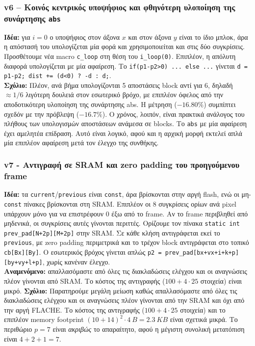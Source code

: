 \documentclass[11pt,a4paper]{article}
\newcommand{\code}[1]{\texttt{#1}}
\newcommand{\en}[1]{\foreignlanguage{english}{#1}}
\begin{document}
\subsubsection{v6 -- Κοινός κεντρικός υποψήφιος και φθηνότερη υλοποίηση της συνάρτησης \code{abs}}
\textbf{Ιδέα:} για $i=0$ ο υποψήφιος στον άξονα $x$ και στον άξονα $y$ είναι το ίδιο μπλοκ, άρα η απόστασή του υπολογίζεται μία φορά και χρησιμοποιείται και στις δύο
συγκρίσεις. Προσθέτουμε νέα \en{macro} \code{c\_loop} στη θέση του \code{i\_loop(0)}. Επιπλέον, η απόλυτη διαφορά υπολογίζεται με μία αφαίρεση.
Το \code{if(p1-p2>0) ... else ...} γίνεται \code{d = p1-p2; dist += (d<0) ? -d : d;}.\\
\textbf{Σχόλιο:} Πλέον, ανά βήμα υπολογίζονται 5 αποστάσεις block αντί για 6, δηλαδή $\approx 1/6$ λιγότερη
δουλειά στον εσωτερικό βρόχο, με επιπλέον όφελος από την αποδοτικότερη υλοποίηση της συνάρτησης abs. Η μέτρηση ($-16.80\%$) συμπίπτει σχεδόν με την πρόβλεψη ($-16.7\%$). Ο
χρόνος, λοιπόν, είναι πρακτικά ανάλογος του πλήθους των υπολογισμών αποστάσεων ανάμεσα σε blocks. Το \code{abs} με μία
αφαίρεση έχει αμελητέα επίδραση. Αυτό είναι λογικό, αφού και η αρχική μορφή εκτελεί απλά μία επιπλέον αφαίρεση μετά τον έλεγχο της συνθήκης.

\subsubsection{v7 - Αντιγραφή σε SRAM και \en{zero padding} του προηγούμενου frame}
\textbf{Ιδέα:} τα \code{current}/\code{previous} είναι \code{const}, άρα βρίσκονται στην
αργή flash, ενώ οι μη-\code{const} πίνακες βρίσκονται στη SRAM. Επιπλέον οι 8 συγκρίσεις ορίων ανά
\en{pixel} υπάρχουν μόνο για να επιστρέφουν 0 έξω από το \en{frame}. Αν το \en{frame} περιβληθεί από
μηδενικά, οι συγκρίσεις αυτές γίνονται περιττές. Ορίζουμε τον πίνακα \code{static int prev\_pad[N+2p][M+2p]} στην SRAM. Σε κάθε κλήση αντιγράφεται εκεί το \code{previous}, με zero padding περιμετρικά και το τρέχον block αντιγράφεται
στο τοπικό \code{cb[Bx][By]}. Ο εσωτερικός βρόχος γίνεται απλώς
\code{p2 = prev\_pad[bx+vx+i+k+p][by+vy+l+p]}, χωρίς κανέναν έλεγχο.\\
\textbf{Αναμενόμενο:} απαλλασόμαστε από όλες τις διακλαδώσεις ελέγχου και οι αναγνώσεις πλέον
γίνονται από SRAM. Το κόστος της αντιγραφής ($\num{100}+4\cdot 25$ στοιχεία) είναι μικρό.
\textbf{Σχόλιο:} Παρατηρούμε μεγάλη μείωση καθώς απαλλασόμαστε από όλες τις διακλαδώσεις ελέγχου και οι αναγνώσεις πλέον
γίνονται από την SRAM και όχι από την αργή FLACHE. Το κόστος της αντιγραφής ($\num{100}+4\cdot 25$ στοιχεία) και το επιπλέον memory footprint $(10+14)^2\cdot\SI{4}{B}=\SI{2.3}{KB}$ είναι σχετικά μικρά. Το περιθώριο $p=7$ είναι \emph{ακριβώς} το απαραίτητο, αφού η μέγιστη συνολική
μετατόπιση είναι $4+2+1=7$.
\end{document}
